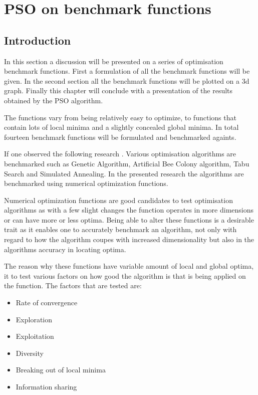 \chapter{PSO on benchmark functions}
\label{chpt:benchmark}
\section{Introduction}
In this section a discussion will be presented on a series of optimisation benchmark functions. First a formulation of all the benchmark functions will be given. In the second section all the benchmark functions will be plotted on a 3d graph. Finally this chapter will conclude with a presentation of the results obtained by the PSO algorithm.

The functions vary from being relatively easy to optimize, to functions that contain lots of local minima and a slightly concealed global minima. In total fourteen benchmark functions will be formulated and benchmarked againts.

If one observed the following research \cite{devparallelgasa,CompuIntelligenceIntro,FundamentalSwarm}. Various optimisation algorithms are benchmarked such as Genetic Algorithm, Artificial Bee Colony algorithm, Tabu Search and Simulated Annealing. In the presented research the algorithms are benchmarked using numerical optimization functions.

Numerical optimization functions are good candidates to test optimisation algorithms as with a few slight changes the function operates in more dimensions or can have more or less optima\cite{devparallelgasa,CompuIntelligenceIntro,FundamentalSwarm}. Being able to alter these functions is a desirable trait as it enables one to accurately benchmark an algorithm, not only with regard to how the algorithm coupes with increased dimensionality but also in the algorithms accuracy in locating optima\cite{devparallelgasa,CompuIntelligenceIntro,FundamentalSwarm}.

The reason why these functions have variable amount of local and global optima, it to test various factors on how good the algorithm is that is being applied on the function. The factors that are tested are\cite{CompuIntelligenceIntro,FundamentalSwarm}:
\begin{itemize}
\item Rate of convergence
\item Exploration
\item Exploitation
\item Diversity
\item Breaking out of local minima
\item Information sharing
\end{itemize}

